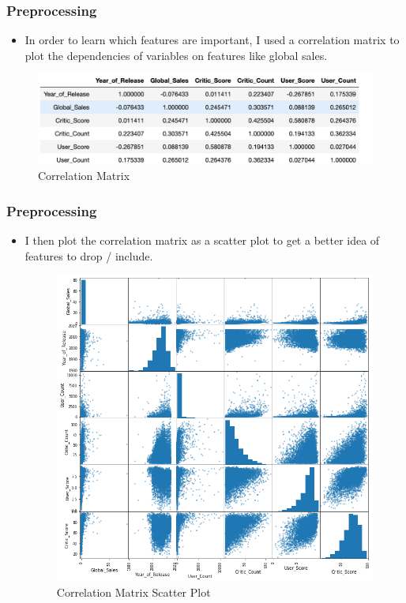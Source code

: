 \begin{frame}
    \frametitle{Preprocessing}
    
    \begin{itemize}
    \item In order to learn which features are important, I used a correlation matrix to plot the dependencies of variables on features like global sales.
       
    
     \end{itemize}   
    \begin{figure}[H]
        \centering
        \includegraphics[scale=0.5]{graphs/correlationmat.png}
        \caption{Correlation Matrix}
        \label{fig:N20}
    \end{figure}
\end{frame}

\begin{frame}
    \frametitle{Preprocessing}
    \begin{itemize}
    \item I then plot the correlation matrix as a scatter plot to get a better idea of features to drop / include. 
    
     \begin{figure}[H]
        \centering
        \includegraphics[scale=0.25]{graphs/plotcorr.png}
        \caption{Correlation Matrix Scatter Plot}
        \label{fig:N20}
    \end{figure}
    
    \end{itemize}
\end{frame}

